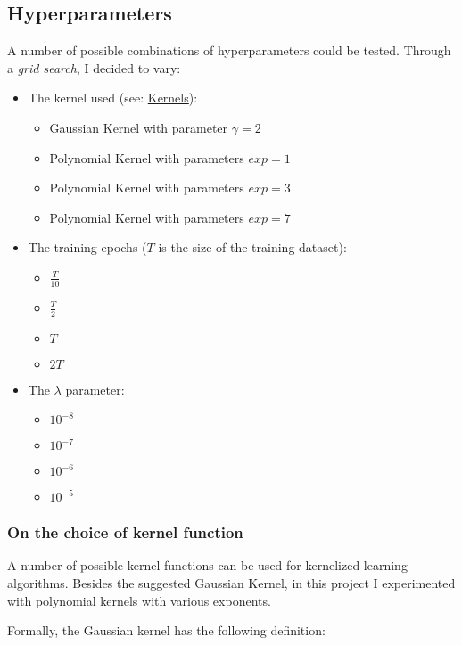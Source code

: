 \documentclass[a4paper]{article}
\begin{document}
\subsection{Hyperparameters}
\label{sec:org50ac3fd}

A number of possible combinations of hyperparameters could be tested. Through a \emph{grid search}, I decided to vary:

\begin{itemize}
\item The kernel used (see: \hyperref[org325df7c]{Kernels}):
\begin{itemize}
\item Gaussian Kernel with parameter \(\gamma = 2\)
\item Polynomial Kernel with parameters \(exp = 1\)
\item Polynomial Kernel with parameters \(exp = 3\)
\item Polynomial Kernel with parameters \(exp = 7\)
\end{itemize}
\item The training epochs (\(T\) is the size of the training dataset):
\begin{itemize}
\item \(\frac{T}{10}\)
\item \(\frac{T}{2}\)
\item \(T\)
\item \(2 T\)
\end{itemize}
\item The \(\lambda\) parameter:
\begin{itemize}
\item \(10^{-8}\)
\item \(10^{-7}\)
\item \(10^{-6}\)
\item \(10^{-5}\)
\end{itemize}
\end{itemize}

\subsubsection{On the choice of kernel function}
\label{sec:orgae0a890}
\label{org325df7c}

A number of possible kernel functions can be used for kernelized learning algorithms. Besides the suggested Gaussian Kernel, in this project I experimented with polynomial kernels with various exponents.

Formally, the Gaussian kernel has the following definition:
\end{document}
